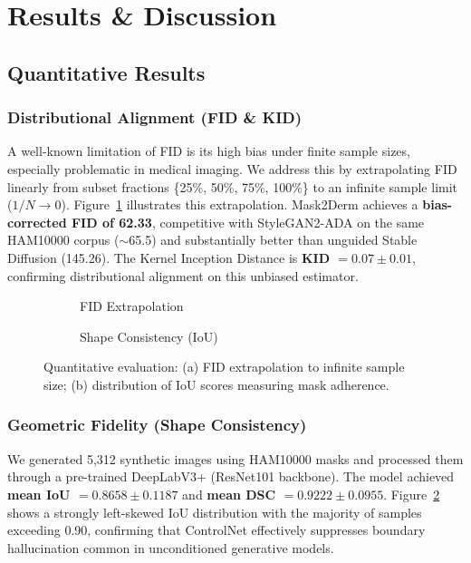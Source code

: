 \section{Results \& Discussion}

\subsection{Quantitative Results}

\subsubsection{Distributional Alignment (FID \& KID)}
A well-known limitation of FID is its high bias under finite sample sizes, especially problematic in medical imaging. We address this by extrapolating FID linearly from subset fractions \{25\%, 50\%, 75\%, 100\%\} to an infinite sample limit ($1/N \to 0$). Figure~\ref{fig:fid_curve} illustrates this extrapolation. Mask2Derm achieves a \textbf{bias-corrected FID of 62.33}, competitive with StyleGAN2-ADA on the same HAM10000 corpus ($\sim$65.5) and substantially better than unguided Stable Diffusion (145.26). The Kernel Inception Distance is \textbf{KID $= 0.07 \pm 0.01$}, confirming distributional alignment on this unbiased estimator.

\begin{figure}[H]
    \centering
    \begin{subfigure}[b]{0.48\textwidth}
        \centering
        \caption{FID Extrapolation}
        \label{fig:fid_curve}
    \end{subfigure}
    \hfill
    \begin{subfigure}[b]{0.48\textwidth}
        \centering
        \caption{Shape Consistency (IoU)}
        \label{fig:iou_dist}
    \end{subfigure}
    \caption{Quantitative evaluation: (a) FID extrapolation to infinite sample size; (b) distribution of IoU scores measuring mask adherence.}
    \label{fig:quantitative_metrics}
\end{figure}

\subsubsection{Geometric Fidelity (Shape Consistency)}
We generated 5,312 synthetic images using HAM10000 masks and processed them through a pre-trained DeepLabV3+ (ResNet101 backbone). The model achieved \textbf{mean IoU $= 0.8658 \pm 0.1187$} and \textbf{mean DSC $= 0.9222 \pm 0.0955$}. Figure~\ref{fig:iou_dist} shows a strongly left-skewed IoU distribution with the majority of samples exceeding 0.90, confirming that ControlNet effectively suppresses boundary hallucination common in unconditioned generative models.

